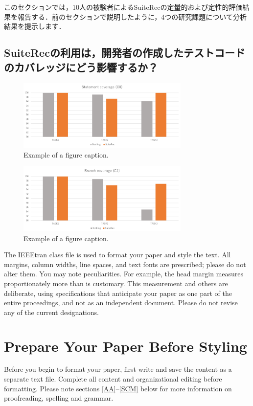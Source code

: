 \documentclass[conference]{IEEEtran}
\begin{document}
このセクションでは，10人の被験者によるSuiteRecの定量的および定性的評価結果を報告する．前のセクションで説明したように，4つの研究課題について分析結果を提示します．

\subsection{SuiteRecの利用は，開発者の作成したテストコードのカバレッジにどう影響するか？}

\begin{figure}[htbp]
\centerline{\includegraphics[width=8.5cm]{C0.pdf}}
\caption{Example of a figure caption.}
\label{fig}
\end{figure}

\begin{figure}[htbp]
\centerline{\includegraphics[width=8.5cm]{C1.pdf}}
\caption{Example of a figure caption.}
\label{fig}
\end{figure}


The IEEEtran class file is used to format your paper and style the text. All margins, 
column widths, line spaces, and text fonts are prescribed; please do not 
alter them. You may note peculiarities. For example, the head margin
measures proportionately more than is customary. This measurement 
and others are deliberate, using specifications that anticipate your paper 
as one part of the entire proceedings, and not as an independent document. 
Please do not revise any of the current designations.

\section{Prepare Your Paper Before Styling}
Before you begin to format your paper, first write and save the content as a 
separate text file. Complete all content and organizational editing before 
formatting. Please note sections \ref{AA}--\ref{SCM} below for more information on 
proofreading, spelling and grammar.
\end{document}
